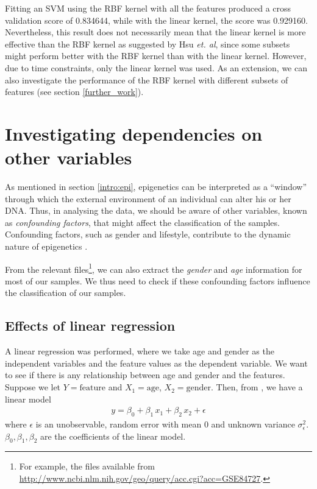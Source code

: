 \documentclass[12pt, twoside, a4paper]{report}
\begin{document}

Fitting an SVM using the RBF kernel with all the features produced a cross validation score of 0.834644, while with the linear kernel, the score was 0.929160. Nevertheless, this result does not necessarily mean that the linear kernel is more effective than the RBF kernel as suggested by Hsu \textit{et. al}, since some subsets might perform better with the RBF kernel than with the linear kernel. However, due to time constraints, only the linear kernel was used. As an extension, we can also investigate the performance of the RBF kernel with different subsets of features (see section \ref{further_work}).

\section{Investigating dependencies on other variables}

As mentioned in section \ref{intro:epi}, epigenetics can be interpreted as a ``window'' through which the external environment of an individual can alter his or her DNA. Thus, in analysing the data, we should be aware of other variables, known as \textit{confounding factors}, that might affect the classification of the samples. Confounding factors, such as gender and lifestyle, contribute to the dynamic nature of epigenetics \cite{RefWorks:78}.

From the relevant files\footnote{For example, the files available from \url{http://www.ncbi.nlm.nih.gov/geo/query/acc.cgi?acc=GSE84727}.}, we can also extract the \textit{gender} and \textit{age} information for most of our samples. We thus need to check if these confounding factors influence the classification of our samples.

\subsection{Effects of linear regression}
A linear regression was performed, where we take age and gender as the independent variables and the feature values as the dependent variable. We want to see if there is any relationship between age and gender and the features. Suppose we let $Y=\text{feature}$ and $X_1=\text{age}$, $X_2=\text{gender}$. Then, from \cite{RefWorks:219}, we have a linear model
\begin{align*}
y = \beta_0 + \beta_1 \, x_1 + \beta_2 \, x_2 + \epsilon
\end{align*}
where $\epsilon$ is an unobservable, random error with mean 0 and unknown variance $\sigma_\epsilon^2$. $\beta_0, \beta_1, \beta_2$ are the coefficients of the linear model.
\end{document}
